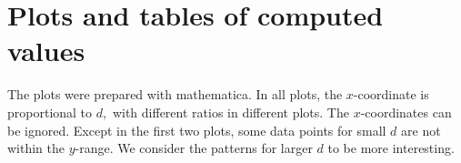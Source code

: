\documentclass[11pt]{amsart} %
\begin{document}
%
%
%
%



\section{Plots and tables of computed values} 
The plots were prepared with  mathematica. In all plots, the $x$-coordinate is proportional to $d,$ with different ratios in different plots. The $x$-coordinates can be ignored. Except in the first two plots, some data points for small $d$ are not within the $y$-range. We consider the patterns for larger $d$ to be more interesting.
\end{document}
